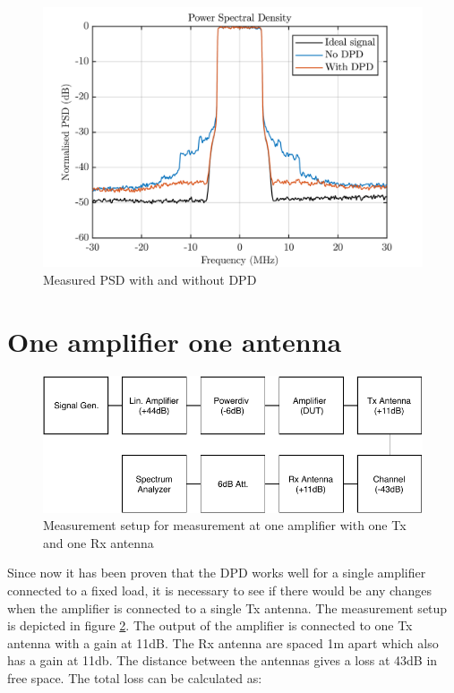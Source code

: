 \begin{figure}[H]
\centering 
\includegraphics[scale = 0.7]{figures/measurement/cree/meas1/PSD_1.png}
\caption{Measured PSD with and without DPD}
\label{fig:meas_amp_PSD}
\end{figure}

\section{One amplifier one antenna}

\begin{figure}[H]
\centering 
\includegraphics[scale = 0.9]{figures/measurement/cree/meas2/meas2.pdf}
\caption{Measurement setup for measurement at one amplifier with one Tx and one Rx antenna}
\label{fig:meas_amp2}
\end{figure}

Since now it has been proven that the DPD works well for a single amplifier connected to a fixed load, it is necessary to see if there would be any changes when the amplifier is connected to a single Tx antenna. The measurement setup is depicted in figure \ref{fig:meas_amp2}. The output of the amplifier is connected to one Tx antenna with a gain at 11dB. The Rx antenna are spaced 1m apart which also has a gain at 11db. The distance between  the antennas gives a loss at 43dB in free space. The total loss can be calculated as:

